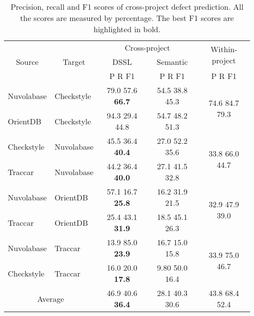 \begin{table}[t!]
	\centering
	\caption{Precision, recall and F1 scores of cross-project defect prediction. All the scores are measured by percentage. The best F1 scores are highlighted in bold.}
	\begin{adjustbox}{width=0.48\textwidth}
	\begin{tabular}{|c|c|c|c|c|}
		\hline
		\multirow{3}[6]{*}{Source } & \multirow{3}[6]{*}{Target} & \multicolumn{2}{c|}{Cross-project} & \multirow{2}[4]{*}{Within-project} \\
		\cline{3-4}          &       & DSSL & Semantic &  \\
		\cline{3-5}          &       & P R F1 & P R F1 & P R F1 \\
		\hline
		\hline
		\multicolumn{1}{|l|}{Nuvolabase} & \multicolumn{1}{l|}{Checkstyle} & 79.0 57.6 \textbf{66.7} & 54.5 38.8 45.3  & \multirow{2}[4]{*}{74.6 84.7 79.3} \\
		\cline{1-4}    \multicolumn{1}{|l|}{OrientDB} & \multicolumn{1}{l|}{Checkstyle} & 94.3 29.4 44.8 & 54.7 48.2 51.3 &  \\
		\hline
		\multicolumn{1}{|l|}{Checkstyle} & \multicolumn{1}{l|}{Nuvolabase} & 45.5 36.4\textbf{ 40.4} & 27.0 52.2 35.6 & \multirow{2}[4]{*}{33.8 66.0 44.7} \\		
		\cline{1-4}    \multicolumn{1}{|l|}{Traccar} & \multicolumn{1}{l|}{Nuvolabase} & 44.2 36.4 \textbf{40.0} & 27.1 41.5 32.8 &  \\
		\hline
		\multicolumn{1}{|l|}{Nuvolabase} & \multicolumn{1}{l|}{OrientDB} & 57.1 16.7\textbf{ 25.8}  & 16.2 31.9 21.5 & \multirow{2}[4]{*}{32.9 47.9 39.0} \\
		\cline{1-4}    \multicolumn{1}{|l|}{Traccar} & \multicolumn{1}{l|}{OrientDB} & 25.4 43.1 \textbf{31.9} & 18.5 45.1 26.3 &  \\
		\hline
		\multicolumn{1}{|l|}{Nuvolabase} & \multicolumn{1}{l|}{Traccar} & 13.9 85.0 \textbf{23.9} & 16.7 15.0 15.8 & \multirow{2}[4]{*}{33.9 75.0 46.7} \\
		\cline{1-4}    \multicolumn{1}{|l|}{Checkstyle} & \multicolumn{1}{l|}{Traccar} & 16.0 20.0 \textbf{17.8} & 9.80 50.0 16.4 &  \\
		\hline
		\hline
		\multicolumn{2}{|c|}{Average} & 46.9 40.6 \textbf{36.4} & 28.1 40.3 30.6 & 43.8 68.4 52.4 \\
		\hline
	\end{tabular}%
	\end{adjustbox}
	\label{tab:cross}%
\end{table}%

